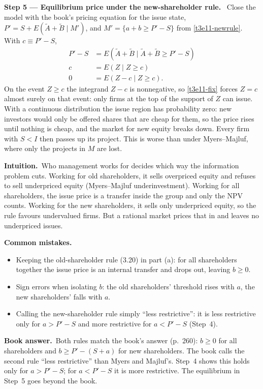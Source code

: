 \documentclass[11pt,a4paper]{article}
\newcommand{\step}[2]{\par\medskip\noindent\textbf{Step #1 --- #2.}~}
\newcommand{\intuition}{\par\medskip\noindent\textbf{Intuition.}~}
\newcommand{\bookans}{\par\medskip\noindent\textbf{Book answer.}~}
\newcommand{\pitfalls}{\par\medskip\noindent\textbf{Common mistakes.}}
\begin{document}
\step{5}{Equilibrium price under the new-shareholder rule} Close the model with the book's pricing
equation for the issue state, $P'=S+E(\widetilde A+\widetilde B\mid M')$, and
$M'=\{a+b\ge P'-S\}$ from \eqref{t3e11-newrule}. With $c\equiv P'-S$,
\begin{align}
  P'-S &= E(\widetilde A+\widetilde B\mid \widetilde A+\widetilde B\ge P'-S) \nonumber\\
  c &= E(Z\mid Z\ge c) \nonumber\\
  0 &= E(Z-c\mid Z\ge c). \label{t3e11-fix}
\end{align}
On the event $Z\ge c$ the integrand $Z-c$ is nonnegative, so \eqref{t3e11-fix} forces $Z=c$ almost surely
on that event: only firms at the top of the support of $Z$ can issue. With a continuous distribution the
issue region has probability zero: new investors would only be offered shares that are cheap for them,
so the price rises until nothing is cheap, and the market for new equity breaks down. Every firm with
$S<I$ then passes up its project. This is worse than under Myers--Majluf, where only the projects in $M$
are lost.

\intuition Who management works for decides which way the information problem cuts. Working for old
shareholders, it sells overpriced equity and refuses to sell underpriced equity (Myers--Majluf
underinvestment). Working for all shareholders, the issue price is a transfer inside the group and only
the NPV counts. Working for the new shareholders, it sells only underpriced equity, so the rule
favours undervalued firms. But a rational market prices that in and leaves no underpriced issues.

\pitfalls
\begin{itemize}
  \item Keeping the old-shareholder rule (3.20) in part (a): for all shareholders together the issue price is an internal transfer and drops out, leaving $b\ge0$.
  \item Sign errors when isolating $b$: the old shareholders' threshold rises with $a$, the new shareholders' falls with $a$.
  \item Calling the new-shareholder rule simply ``less restrictive'': it is less restrictive only for $a>P'-S$ and more restrictive for $a<P'-S$ (Step~4).
\end{itemize}

\bookans Both rules match the book's answer (p.~260): $b\ge0$ for all shareholders and
$b\ge P'-(S+a)$ for new shareholders. The book calls the second rule ``less restrictive'' than Myers and
Majluf's. Step~4 shows this holds only for $a>P'-S$; for $a<P'-S$ it is more restrictive. The
equilibrium in Step~5 goes beyond the book.
\end{document}
